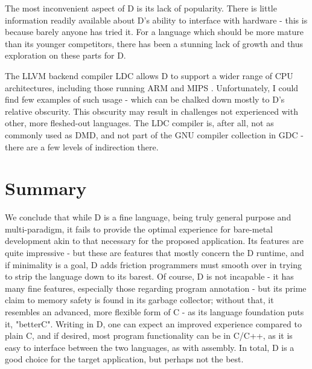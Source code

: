 \documentclass[letterpaper,twocolumn,10pt]{article}
\begin{document}
The most inconvenient aspect of D is its lack of popularity.  There is little
information readily available about D's ability to interface with hardware - this
is because barely anyone has tried it.  For a language which should be more 
mature than its younger competitors, there has been a stunning lack of growth
and thus exploration on these parts for D.  

The LLVM backend compiler LDC allows D to support a wider range of CPU
architectures, including those running ARM and MIPS \cite{areas}.  Unfortunately, 
I could find few examples of such usage - which can be chalked down mostly to
D's relative obscurity.  This obscurity may result in challenges not experienced
with other, more fleshed-out languages.  The LDC compiler is, after all, not as
commonly used as DMD, and not part of the GNU compiler collection in GDC - there
are a few levels of indirection there.


\section*{Summary}

We conclude that while D is a fine language, being truly general purpose and 
multi-paradigm, it fails to provide the optimal experience for bare-metal
development akin to that necessary for the proposed application.  Its features
are quite impressive - but these are features that mostly concern the D runtime,
and if minimality is a goal, D adds friction programmers must smooth over
in trying to strip the language down to its barest.  Of course, D is not
incapable - it has many fine features, especially those regarding program
annotation - but its prime claim to memory safety is found in its garbage
collector; without that, it resembles an advanced, more flexible form of C - as
its language foundation puts it, "betterC".  Writing in D, one can expect an
improved experience compared to plain C, and if desired, most program 
functionality can be in C/C++, as it is easy to interface between the two 
languages, as with assembly.  In total, D is a good choice for the 
target application, but perhaps not the best.


\vfill

\printbibliography
\end{document}
